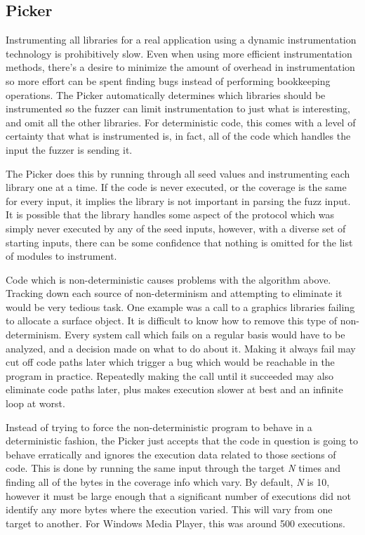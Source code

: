 \subsection{Picker} \label{Picker}
Instrumenting all libraries for a real application using a dynamic
instrumentation technology is prohibitively slow. Even when using more
efficient instrumentation methods, there's a desire to minimize the amount of
overhead in instrumentation so more effort can be spent finding bugs instead of
performing bookkeeping operations.  The Picker automatically determines which
libraries should be instrumented so the fuzzer can limit instrumentation to
just what is interesting, and omit all the other libraries. For deterministic
code, this comes with a level of certainty that what is instrumented is, in
fact, all of the code which handles the input the fuzzer is sending it.

The Picker does this by running through all seed values and instrumenting each
library one at a time. If the code is never executed, or the coverage is the
same for every input, it implies the library is not important in parsing the
fuzz input.  It is possible that the library handles some aspect of the
protocol which was simply never executed by any of the seed inputs, however,
with a diverse set of starting inputs, there can be some confidence that
nothing is omitted for the list of modules to instrument.

Code which is non-deterministic causes problems with the algorithm above.
Tracking down each source of non-determinism and attempting to eliminate it
would be very tedious task. One example was a call to a graphics libraries
failing to allocate a surface object. It is difficult to know how to remove
this type of non-determinism. Every system call which fails on a regular
basis would have to be analyzed, and a decision made on what to do about it.
Making it always fail may cut off code paths later which trigger a bug which
would be reachable in the program in practice.  Repeatedly making the call
until it succeeded may also eliminate code paths later, plus makes execution
slower at best and an infinite loop at worst.

Instead of trying to force the non-deterministic program to behave in a
deterministic fashion, the Picker just accepts that the code in question is
going to behave erratically and ignores the execution data related to those
sections of code.  This is done by running the same input through the target
\textit{N} times and finding all of the bytes in the coverage info which
vary. By default, \textit{N} is 10, however it must be large enough that a
significant number of executions did not identify any more bytes where the
execution varied. This will vary from one target to another.  For Windows
Media Player, this was around 500 executions.  %


